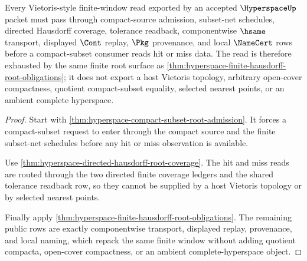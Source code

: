 \begin{theorem}
\label{thm:hyperspace-vietoris-finite-window}
Every Vietoris-style finite-window read exported by an accepted $\HyperspaceUp$ packet must pass through compact-source admission, subset-net schedules, directed Hausdorff coverage, tolerance readback, componentwise $\hsame$ transport, displayed $\Cont$ replay, $\Pkg$ provenance, and local $\NameCert$ rows before a compact-subset consumer reads hit or miss data. The read is therefore exhausted by the same finite root surface as \autoref{thm:hyperspace-finite-hausdorff-root-obligations}; it does not export a host Vietoris topology, arbitrary open-cover compactness, quotient compact-subset equality, selected nearest points, or an ambient complete hyperspace.
\end{theorem}
\begin{proof}
Start with \autoref{thm:hyperspace-compact-subset-root-admission}. It forces a compact-subset request to enter through the compact source and the finite subset-net schedules before any hit or miss observation is available.

Use \autoref{thm:hyperspace-directed-hausdorff-root-coverage}. The hit and miss reads are routed through the two directed finite coverage ledgers and the shared tolerance readback row, so they cannot be supplied by a host Vietoris topology or by selected nearest points.

Finally apply \autoref{thm:hyperspace-finite-hausdorff-root-obligations}. The remaining public rows are exactly componentwise transport, displayed replay, provenance, and local naming, which repack the same finite window without adding quotient compacta, open-cover compactness, or an ambient complete-hyperspace object.
\end{proof}
